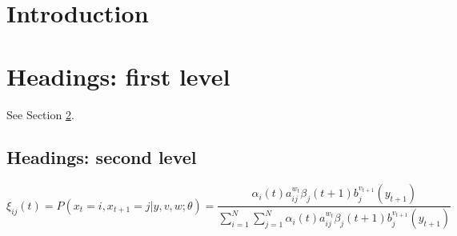 \documentclass{article}
\begin{document}
\section{Introduction}
\section{Headings: first level}
\label{sec:headings}
See Section \ref{sec:headings}.

\subsection{Headings: second level}
\begin{equation}
    \xi _{ij}(t) = P(x_{t}=i,x_{t+1}=j|y,v,w;\theta)= {\frac {\alpha_{i}(t)a^{w_t}_{ij}\beta _{j}(t+1)b^{v_{t+1}}_{j}(y_{t+1})}{\sum_{i=1}^{N} \sum _{j=1}^{N} \alpha _{i}(t)a ^{w_t}_{ij}\beta _{j}(t+1)b^{v_{t+1}}_{j}(y_{t+1})}}
\end{equation}
\end{document}
